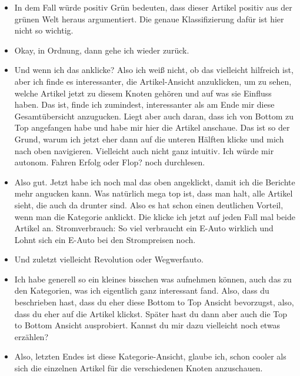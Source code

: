 {\begin{itemize}[]
    Aber warum sind die jetzt bei Grün positiv?
    Also ich hätte jetzt vermutet, dass es wahrscheinlich ein kritischer Artikel ist, aber ist wahrscheinlich auch nicht so relevant gerade, oder?
    \item {} In dem Fall würde positiv Grün bedeuten, dass dieser Artikel positiv aus der grünen Welt heraus argumentiert.
    Die genaue Klassifizierung dafür ist hier nicht so wichtig.
    \item {} Okay, in Ordnung, dann gehe ich wieder zurück.
    \item {} Und wenn ich das anklicke? 
    Also ich weiß nicht, ob das vielleicht hilfreich ist, aber ich finde es interessanter, die Artikel-Ansicht anzuklicken, um zu sehen, welche Artikel jetzt zu diesem Knoten gehören und auf was sie Einfluss haben.
    Das ist, finde ich zumindest, interessanter als am Ende mir diese Gesamtübersicht anzugucken.
    Liegt aber auch daran, dass ich von Bottom zu Top angefangen habe und habe mir hier die Artikel anschaue.
    Das ist so der Grund, warum ich jetzt eher dann auf die unteren Hälften klicke und mich nach oben navigieren.
    Vielleicht auch nicht ganz intuitiv.
    Ich würde mir \flqq autonom. Fahren Erfolg oder Flop?\frqq{} noch durchlesen.
    \item {} Also gut. Jetzt habe ich noch mal das oben angeklickt, damit ich die Berichte mehr angucken kann.
    Was natürlich mega top ist, dass man halt, alle Artikel sieht, die auch da drunter sind. 
    Also es hat schon einen deutlichen Vorteil, wenn man die Kategorie anklickt.
    Die klicke ich jetzt auf jeden Fall mal beide Artikel an.
    \flqq Stromverbrauch: So viel verbraucht ein E-Auto wirklich\frqq{} und \flqq Lohnt sich ein E-Auto bei den Strompreisen noch\frqq{}.
    \item {} Und zuletzt vielleicht \flqq Revolution oder Wegwerfauto\frqq{}.
    \item {} Ich habe generell so ein kleines bisschen was aufnehmen können, auch das zu den Kategorien, was ich eigentlich ganz interessant fand.
    Also, dass du beschrieben hast, dass du eher diese Bottom to Top Ansicht bevorzugst, also, dass du eher auf die Artikel klickst.
    Später hast du dann aber auch die Top to Bottom Ansicht ausprobiert.
    Kannst du mir dazu vielleicht noch etwas erzählen?
    \item {} Also, letzten Endes ist diese Kategorie-Ansicht, glaube ich, schon cooler als sich die einzelnen Artikel für die verschiedenen Knoten anzuschauen.

\end{itemize}}

